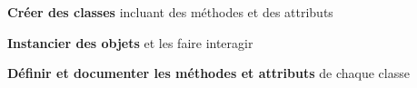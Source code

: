 \item \textbf{Créer des classes} incluant des méthodes et des attributs
\item \textbf{Instancier des objets} et les faire interagir
\item \textbf{Définir et documenter les méthodes et attributs} de chaque classe
